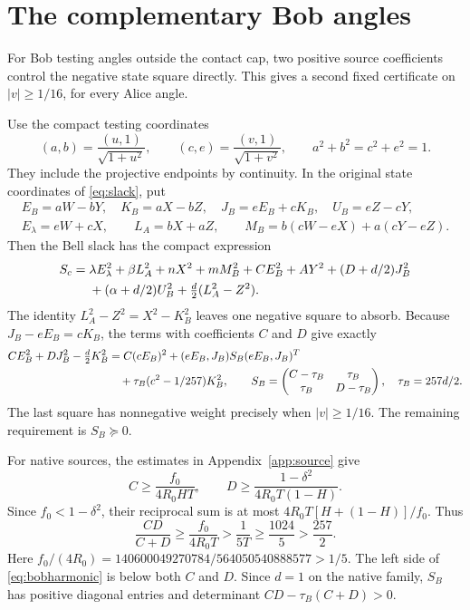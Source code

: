 \section{The complementary Bob angles}\label{app:bob}
For Bob testing angles outside the contact cap, two positive source
coefficients control the negative state square directly. This gives a
second fixed certificate on $|v|\geq1/16$, for every Alice angle.

Use the compact testing coordinates
\[
 (a,b)=\frac{(u,1)}{\sqrt{1+u^2}},\qquad
 (c,e)=\frac{(v,1)}{\sqrt{1+v^2}},\qquad
 a^2+b^2=c^2+e^2=1.
\]
They include the projective endpoints by continuity. In the original
state coordinates of \eqref{eq:slack}, put
\begin{gather*}
 E_B=aW-bY,\quad K_B=aX-bZ,\quad J_B=eE_B+cK_B,\quad U_B=eZ-cY,\\
 E_\lambda=eW+cX,\qquad L_A=bX+aZ,\qquad
 M_B=b(cW-eX)+a(cY-eZ).
\end{gather*}
Then the Bell slack has the compact expression
\begin{align}
 S_c={}&\lambda E_\lambda^2+\beta L_A^2+nX^2+mM_B^2+CE_B^2+AY^2
 +(D+d/2)J_B^2\notag\\
 &+(\alpha+d/2)U_B^2+\tfrac d2(L_A^2-Z^2).
 \label{eq:bobparent}
\end{align}
The identity $L_A^2-Z^2=X^2-K_B^2$ leaves one negative square to absorb.
Because $J_B-eE_B=cK_B$, the terms with coefficients $C$ and $D$
give exactly
\begin{align}
 CE_B^2+DJ_B^2-\tfrac d2K_B^2
 &=C(cE_B)^2+(eE_B,J_B)S_B(eE_B,J_B)^T\notag\\
 &\quad+\tau_B(c^2-1/257)K_B^2,\qquad
 S_B=\begin{pmatrix}C-\tau_B&\tau_B\\\tau_B&D-\tau_B\end{pmatrix},
 \quad \tau_B=257d/2.
 \label{eq:boballocation}
\end{align}
The last square has nonnegative weight precisely when $|v|\geq1/16$.
The remaining requirement is $S_B\succeq0$.

For native sources, the estimates in Appendix~\ref{app:source} give
\[
 C\geq\frac{f_0}{4R_0HT},\qquad
 D\geq\frac{1-\delta^2}{4R_0T(1-H)}.
\]
Since $f_0<1-\delta^2$, their reciprocal sum is at most
$4R_0T[H+(1-H)]/f_0$. Thus
\begin{equation}
 \frac{CD}{C+D}\geq\frac{f_0}{4R_0T}
 >\frac1{5T}\geq\frac{1024}{5}>\frac{257}{2}.
 \label{eq:bobharmonic}
\end{equation}
Here $f_0/(4R_0)=140600049270784/564050540888577>1/5$.
The left side of \eqref{eq:bobharmonic} is below both $C$ and $D$.
Since $d=1$ on the native family, $S_B$ has positive diagonal entries
and determinant $CD-\tau_B(C+D)>0$.


